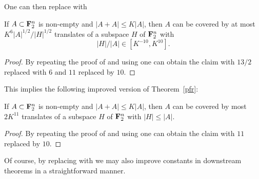 One can then replace  with

\begin{lemma}\label{pfr_aux-improv}\leanok
If $A \subset {\bf F}_2^n$ is non-empty and
$|A+A| \leq K|A|$, then $A$ can be covered by at most $K^6 |A|^{1/2}/|H|^{1/2}$ translates of a subspace $H$ of ${\bf F}_2^n$ with
$$
  |H|/|A| \in [K^{-10}, K^{10}].
$$
\end{lemma}

\begin{proof}\leanok
By repeating the proof of  and using  one can obtain the claim with $13/2$
replaced with $6$ and $11$ replaced by $10$.
\end{proof}

This implies the following improved version of Theorem~\ref{pfr}:

\begin{theorem}\label{pfr-improv}\leanok
  If $A \subset {\bf F}_2^n$ is non-empty and $|A+A| \leq K|A|$, then $A$ can be covered by most $2K^{11}$ translates of a subspace $H$ of ${\bf F}_2^n$ with $|H| \leq |A|$.
\end{theorem}

\begin{proof}\leanok
By repeating the proof of  and using  one can obtain the claim with $11$ replaced by $10$.
\end{proof}

Of course, by replacing  with  we may also improve constants in downstream theorems in a straightforward manner.
